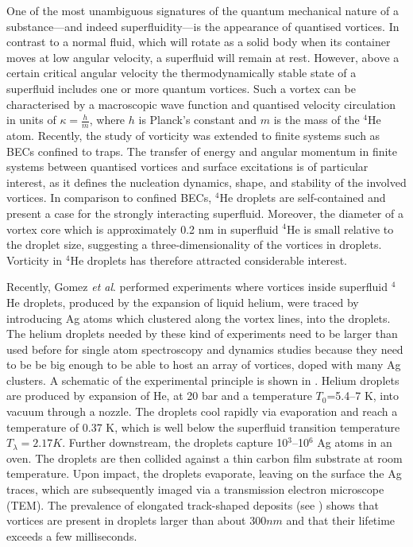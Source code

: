		One of the most unambiguous signatures of the quantum mechanical nature of a substance---and indeed superfluidity---is the appearance of quantised vortices. In contrast to a normal fluid, which will rotate as a solid body when its container moves at low angular velocity, a superfluid will remain at rest. However, above a certain critical angular velocity the thermodynamically stable state of a superfluid includes one or more quantum vortices. Such a vortex can be characterised by a macroscopic wave function and quantised velocity circulation in units of $\kappa=\frac{h}{m}$, where $h$ is Planck’s constant and $m$ is the mass of the $^4$He atom\citep{Don91,Pit03}. Recently, the study of vorticity was extended to finite systems such as BECs confined to traps\citep{Pit03,Fetter2009}. The transfer of energy and angular momentum in finite systems between quantised vortices and surface excitations is of particular interest, as it defines the nucleation dynamics, shape, and stability of the involved vortices\citep{Pit03,Fetter2009}. In comparison to confined BECs, $^4$He droplets are self-contained and present a case for the strongly interacting superfluid. Moreover, the diameter of a vortex core which is approximately 0.2 nm in superfluid $^4$He\citep{Don91} is small relative to the droplet size, suggesting a three-dimensionality of the vortices in droplets. Vorticity in $^4$He droplets has therefore attracted considerable interest\citep{Clo98,Lehmann2003,Bar06,Sti06}.
	
		Recently, Gomez \emph{et al}. performed experiments\citep{Gom12} where vortices inside superfluid $^4$He droplets, produced by the expansion of liquid helium, were traced by introducing Ag atoms which clustered along the vortex lines, into the droplets. The helium droplets needed by these kind of experiments need to be larger than used before for single atom spectroscopy and dynamics studies because they need to be be big enough to be able to host an array of vortices, doped with many Ag clusters. A schematic of the experimental principle is shown in . Helium droplets are produced by expansion of He, at 20 bar and a temperature $T_0$=5.4--7 K, into vacuum through a nozzle. The droplets cool rapidly via evaporation and reach a temperature of 0.37 K\citep{Hartmann1995}, which is well below the superfluid transition temperature $T_\lambda=2.17\unit{K}$\citep{Don91,Pit03}. Further downstream, the droplets capture 10$^3$–10$^6$ Ag atoms in an oven\citep{Log11d}. The droplets are then collided against a thin carbon film substrate at room temperature\citep{Log11d}. Upon impact, the droplets evaporate, leaving on the surface the Ag traces, which are subsequently imaged via a transmission electron microscope (TEM). The prevalence of elongated track-shaped deposits (see ) shows that vortices are present in droplets larger than about $300\unit{nm}$ and that their lifetime exceeds a few milliseconds.
	

